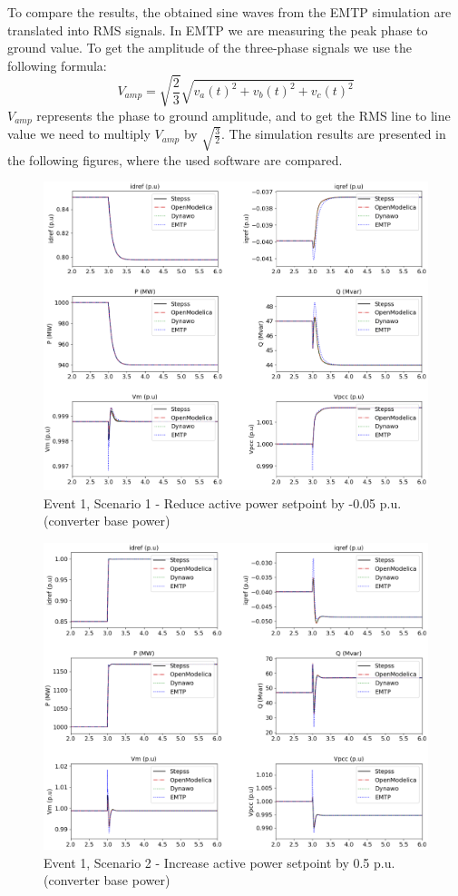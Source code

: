 \documentclass{report}
\begin{document}
To compare the results, the obtained sine waves from the EMTP simulation are translated into RMS signals. In EMTP we are measuring the peak phase to ground value. To get the amplitude of the three-phase signals we use the following formula:
\begin{equation}
    V_{amp} = \sqrt{\frac{2}{3}}\sqrt{v_a(t)^2 + v_b(t)^2 + v_c(t)^2}
    \label{sine_to_RMS}
\end{equation}
$V_{amp}$ represents the phase to ground amplitude, and to get the RMS line to line value we need to multiply $V_{amp}$ by $\sqrt{\frac{3}{2}}$.
The simulation results are presented in the following figures, where the used software are compared.
\begin{figure}[H]
    \centering
    \includegraphics[scale = 0.61]{Simulation_results/Event1Scenario1.png}
    \caption{Event 1, Scenario 1 - Reduce active power setpoint  by -0.05 p.u. (converter base power)}
    \label{fig:Event1Scenario1}
\end{figure}
\begin{figure}[H]
    \centering
    \includegraphics[scale = 0.61]{Simulation_results/Event1Scenario2.png}
    \caption{Event 1, Scenario 2 - Increase active power setpoint by 0.5 p.u. (converter base power)}
    \label{fig:Event1Scenario2}
\end{figure}
\end{document}
